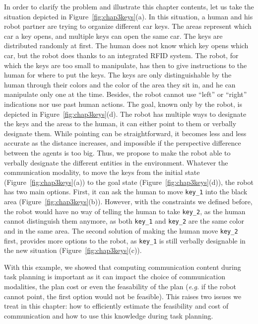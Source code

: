 \documentclass[a4paper,11pt,twoside]{StyleThese}
\begin{document}
In order to clarify the problem and illustrate this chapter contents, let us take the situation depicted in Figure~\ref{fig:chap3keys}(a). In this situation, a human and his robot partner are trying to organize different car keys. The areas represent which car a key opens, and multiple keys can open the same car. The keys are distributed randomly at first. The human does not know which key opens which car, but the robot does thanks to an integrated RFID system. The robot, for which the keys are too small to manipulate, has then to give instructions to the human for where to put the keys. The keys are only distinguishable by the human through their colors and the color of the area they sit in, and he can manipulate only one at the time. Besides, the robot cannot use ``left'' or ``right'' indications nor use past human actions.
The goal, known only by the robot, is depicted in Figure~\ref{fig:chap3keys}(d). The robot has multiple ways to designate the keys and the areas to the human, it can either point to them or verbally designate them. While pointing can be straightforward, it becomes less and less accurate as the distance increases, and impossible if the perspective difference between the agents is too big. Thus, we propose to make the robot able to verbally designate the different entities in the environment.
Whatever the communication modality, to move the keys from the initial state (Figure~\ref{fig:chap3keys}(a)) to the goal state (Figure~\ref{fig:chap3keys}(d)), the robot has two main options. First, it can ask the human to move \verb'key_1' into the black area (Figure~\ref{fig:chap3keys}(b)). However, with the constraints we defined before, the robot would have no way of telling the human to take \verb'key_2', as the human cannot distinguish them anymore, as both \verb'key_1' and \verb'key_2' are the same color and in the same area. The second solution of making the human move \verb'key_2' first, provides more options to the robot, as \verb'key_1' is still verbally designable in the new situation (Figure~\ref{fig:chap3keys}(c)).

With this example, we showed that computing communication content during task planning is important as it can impact the choice of communication modalities, the plan cost or even the feasability of the plan (\textit{e.g.} if the robot cannot point, the first option would not be feasible). This raises two issues we treat in this chapter: how to efficiently estimate the feasibility and cost of communication and how to use this knowledge during task planning.
\end{document}
